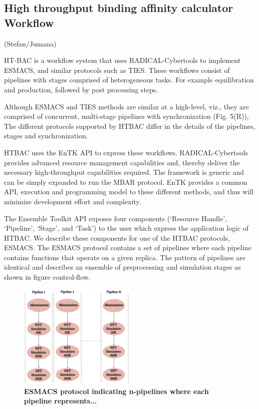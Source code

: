 \subsection{High throughput binding affinity calculator Workflow}

(Stefan/Jumana)


HT-BAC is a workflow system that uses RADICAL-Cybertools to implement ESMACS,
and similar protocols such as TIES. These workflows consist of pipelines with
stages comprised of heterogeneous tasks. For example equilibration and
production, followed by post processing steps. 

Although ESMACS and TIES methods are similar at a high-level, viz., they are
comprised of concurrent, multi-stage pipelines with synchronization (Fig.
5(R)), The different protocols supported by HTBAC differ in the details of the
pipelines, stages and synchronization.

HTBAC uses the EnTK API to express these workflows. RADICAL-Cybertools
provides advanced resource management capabilities and, thereby deliver the
necessary high-throughput capabilities required. The framework is generic and
can be simply expanded to run the MBAR protocol. EnTK provides a common API,
execution and programming model to these different methods, and thus will
minimize development effort and complexity.

The Ensemble Toolkit API exposes four components (‘Resource
Handle’, ‘Pipeline’, ‘Stage’, and ‘Task') to the user which express the
application logic of HTBAC. We describe these components for one of the HTBAC
protocols, ESMACS. The ESMACS protocol contains a set of pipelines where each
pipeline contains functions that operate on a given replica. The pattern of
pipelines are identical and describes an ensemble of preprocessing and
simulation stages as shown in figure control-flow.

\begin{figure}[ht]
\centering
  \includegraphics[width=0.5\textwidth]{FIGURES/HT-BAC-NAMD-pipelines-control-flow-only.pdf}
  \caption{\bf ESMACS protocol indicating n-pipelines where each pipeline represents...}
   \label{figure:ESMACS-pipelines}
\end{figure}

